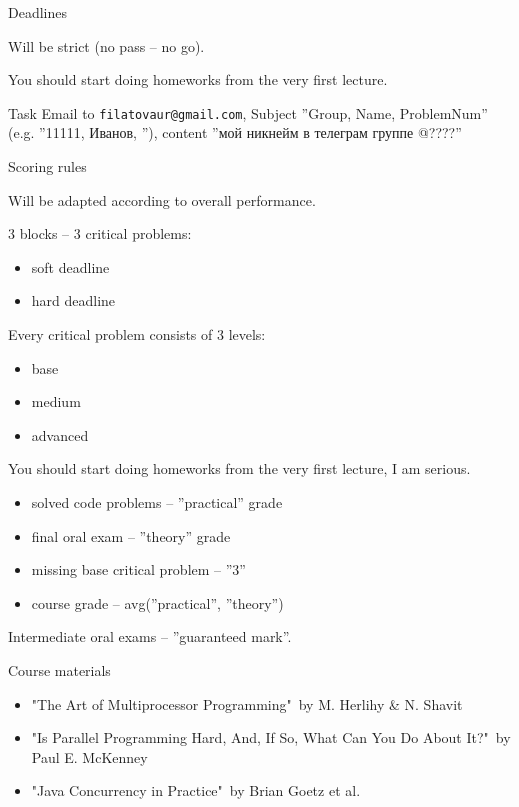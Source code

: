 \begin{frame}{Deadlines}

Will be strict (no pass -- no go).

You should start doing homeworks from the very first lecture.

\pause

\begin{homeworkmail}{Task \taskHW}{
    Email to \texttt{filatovaur@gmail.com}, Subject ''Group, Name, ProblemNum'' (e.g. ''11111, Иванов, \taskHW''), content ''мой никнейм в телеграм группе @????''
}
\end{homeworkmail}

\end{frame}

\begin{frame}{Scoring rules}

Will be adapted according to overall performance.

\pause

3 blocks -- 3 critical problems:
\begin{itemize}
    \item soft deadline
    \item hard deadline
\end{itemize}

Every critical problem consists of 3 levels:
\begin{itemize}
    \item base
    \item medium
    \item advanced
\end{itemize}

\pause

You should start doing homeworks from the very first lecture, I am serious.

\pause

\begin{itemize}
    \item solved code problems -- ''practical'' grade
    \item final oral exam -- ''theory'' grade
    \item missing base critical problem -- ''3''
    \item course grade -- avg(''practical'', ''theory'')
\end{itemize}

Intermediate oral exams -- ''guaranteed mark''.
\end{frame}


\begin{frame}{Course materials}
\begin{itemize}
    \item "The Art of Multiprocessor Programming"\ by M. Herlihy \& N. Shavit
    \item "Is Parallel Programming Hard, And, If So, What Can You Do About It?"\ by Paul E. McKenney
    \item "Java Concurrency in Practice"\ by Brian Goetz et al.
\end{itemize}
\end{frame}


